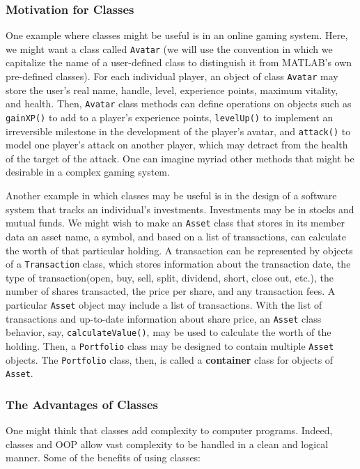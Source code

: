 \subsubsection{Motivation for Classes}
One example where classes might be useful is in an online gaming system. Here, we might want a class called \texttt{Avatar} (we will use the convention in which we capitalize the name of a user-defined class to distinguish it from MATLAB's own pre-defined classes). For each individual player, an object of class \texttt{Avatar} may store the user's real name, handle, level, experience points, maximum vitality, and health. Then, \texttt{Avatar} class methods can define operations on objects such as \texttt{gainXP()} to add to a player's experience points, \texttt{levelUp()} to implement an irreversible milestone in the development of the player's avatar, and \texttt{attack()} to model one player's attack on another player, which may detract from the health of the target of the attack. One can imagine myriad other methods that might be desirable in a complex gaming system.

Another example in which classes may be useful is in the design of a software system that tracks an individual's investments. Investments may be in stocks and mutual funds. We might wish to make an \texttt{Asset} class that stores in its member data an asset name, a symbol, and based on a list of transactions, can calculate the worth of that particular holding. A transaction can be represented by objects of a \texttt{Transaction} class, which stores information about the transaction date, the type of transaction(open, buy, sell, split, dividend, short, close out, etc.), the number of shares transacted, the price per share, and any transaction fees. A particular \texttt{Asset} object may include a list of transactions. With the list of transactions and up-to-date information about share price, an \texttt{Asset} class behavior, say, \texttt{calculateValue()}, may be used to calculate the worth of the holding. Then, a \texttt{Portfolio} class may be designed to contain multiple \texttt{Asset} objects. The \texttt{Portfolio} class, then, is called a \textbf{container} class for objects of \texttt{Asset}.

\subsubsection{The Advantages of Classes}

One might think that classes add complexity to computer programs. Indeed, classes and OOP allow vast complexity to be handled in a clean and logical manner. Some of the benefits of using classes:

